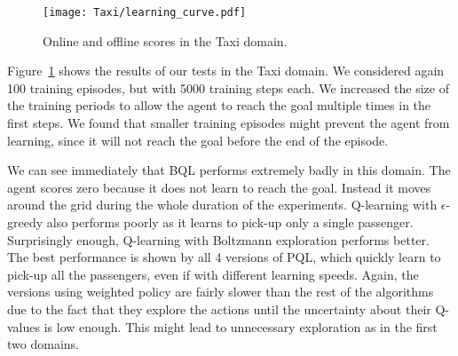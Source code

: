 \begin{figure}
 \texttt{[image: Taxi/learning\_curve.pdf]}
 \caption{Online and offline scores in the Taxi domain.}
 \label{fig:taxi_learning_curve}
\end{figure}
Figure~\ref{fig:taxi_learning_curve} shows the results of our tests in the Taxi domain. We considered again 100 training episodes, but with 5000 training steps each. We increased the size of the training periods to allow the agent to reach the goal multiple times in the first steps. We found that smaller training episodes might prevent the agent from learning, since it will not reach the goal before the end of the episode.\par
We can see immediately that BQL performs extremely badly in this domain. The agent scores zero because it does not learn to reach the goal. Instead it moves around the grid during the whole duration of the experiments. Q-learning with $\epsilon$-greedy also performs poorly as it learns to pick-up only a single passenger. Surprisingly enough, Q-learning with Boltzmann exploration performs better. The best performance is shown by all 4 versions of PQL, which quickly learn to pick-up all the passengers, even if with different learning speeds. Again, the versions using weighted policy are fairly slower than the rest of the algorithms due to the fact that they explore the actions until the uncertainty about their Q-values is low enough. This might lead to unnecessary exploration as in the first two domains.
